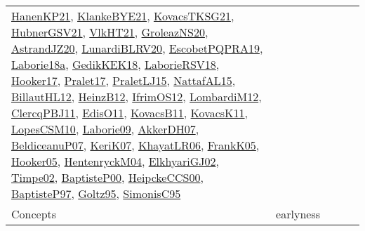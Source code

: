 {\begin{longtable}{llp{6cm}p{6cm}p{6cm}}
\href{papers/HanenKP21.pdf}{HanenKP21}\cite{HanenKP21}, \href{papers/KlankeBYE21.pdf}{KlankeBYE21}\cite{KlankeBYE21}, \href{papers/KovacsTKSG21.pdf}{KovacsTKSG21}\cite{KovacsTKSG21}, \href{articles/HubnerGSV21.pdf}{HubnerGSV21}\cite{HubnerGSV21}, \href{articles/VlkHT21.pdf}{VlkHT21}\cite{VlkHT21}, \href{papers/GroleazNS20.pdf}{GroleazNS20}\cite{GroleazNS20}, \href{articles/AstrandJZ20.pdf}{AstrandJZ20}\cite{AstrandJZ20}, \href{articles/LunardiBLRV20.pdf}{LunardiBLRV20}\cite{LunardiBLRV20}, \href{articles/EscobetPQPRA19.pdf}{EscobetPQPRA19}\cite{EscobetPQPRA19}, \href{papers/Laborie18a.pdf}{Laborie18a}\cite{Laborie18a}, \href{articles/GedikKEK18.pdf}{GedikKEK18}\cite{GedikKEK18}, \href{articles/LaborieRSV18.pdf}{LaborieRSV18}\cite{LaborieRSV18}, \href{papers/Hooker17.pdf}{Hooker17}\cite{Hooker17}, \href{papers/Pralet17.pdf}{Pralet17}\cite{Pralet17}, \href{papers/PraletLJ15.pdf}{PraletLJ15}\cite{PraletLJ15}, \href{articles/NattafAL15.pdf}{NattafAL15}\cite{NattafAL15}, \href{papers/BillautHL12.pdf}{BillautHL12}\cite{BillautHL12}, \href{papers/HeinzB12.pdf}{HeinzB12}\cite{HeinzB12}, \href{papers/IfrimOS12.pdf}{IfrimOS12}\cite{IfrimOS12}, \href{articles/LombardiM12.pdf}{LombardiM12}\cite{LombardiM12}, \href{papers/ClercqPBJ11.pdf}{ClercqPBJ11}\cite{ClercqPBJ11}, \href{papers/EdisO11.pdf}{EdisO11}\cite{EdisO11}, \href{articles/KovacsB11.pdf}{KovacsB11}\cite{KovacsB11}, \href{articles/KovacsK11.pdf}{KovacsK11}\cite{KovacsK11}, \href{articles/LopesCSM10.pdf}{LopesCSM10}\cite{LopesCSM10}, \href{papers/Laborie09.pdf}{Laborie09}\cite{Laborie09}, \href{papers/AkkerDH07.pdf}{AkkerDH07}\cite{AkkerDH07}, \href{papers/BeldiceanuP07.pdf}{BeldiceanuP07}\cite{BeldiceanuP07}, \href{papers/KeriK07.pdf}{KeriK07}\cite{KeriK07}, \href{articles/KhayatLR06.pdf}{KhayatLR06}\cite{KhayatLR06}, \href{papers/FrankK05.pdf}{FrankK05}\cite{FrankK05}, \href{articles/Hooker05.pdf}{Hooker05}\cite{Hooker05}, \href{papers/HentenryckM04.pdf}{HentenryckM04}\cite{HentenryckM04}, \href{papers/ElkhyariGJ02.pdf}{ElkhyariGJ02}\cite{ElkhyariGJ02}, \href{articles/Timpe02.pdf}{Timpe02}\cite{Timpe02}, \href{articles/BaptisteP00.pdf}{BaptisteP00}\cite{BaptisteP00}, \href{articles/HeipckeCCS00.pdf}{HeipckeCCS00}\cite{HeipckeCCS00}, \href{papers/BaptisteP97.pdf}{BaptisteP97}\cite{BaptisteP97}, \href{papers/Goltz95.pdf}{Goltz95}\cite{Goltz95}, \href{papers/SimonisC95.pdf}{SimonisC95}\cite{SimonisC95}\\
Concepts & earlyness &  &  & \\

\end{longtable}}
